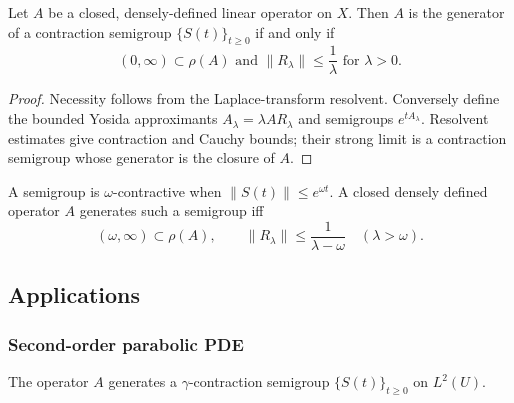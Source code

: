 \begin{theorem}
\label{thm:hille-yosida-theorem}
Let $A$ be a closed, densely-defined linear operator on $X$. Then $A$ is the generator of a contraction semigroup $\{S(t)\}_{t \geq 0}$ if and only if
\[
(0,\infty) \subset \rho(A) \text{ and } \|R_\lambda\| \leq \frac{1}{\lambda} \text{ for } \lambda > 0.
\tag{17}
\]
\end{theorem}

\begin{proof}
\sketch Necessity follows from the Laplace-transform resolvent. Conversely define the bounded Yosida approximants $A_\lambda=\lambda AR_\lambda$ and semigroups $e^{tA_\lambda}$. Resolvent estimates give contraction and Cauchy bounds; their strong limit is a contraction semigroup whose generator is the closure of $A$.
\end{proof}

\begin{remark}
\label{rem:omega-contractive-semigroup}
A semigroup is $\omega$-contractive when $\|S(t)\|\le e^{\omega t}$. A closed densely defined operator $A$ generates such a semigroup iff
\[
(\omega,\infty)\subset\rho(A),\qquad
\|R_\lambda\|\le\frac1{\lambda-\omega}\quad(\lambda>\omega).
\tag{23}
\]
\end{remark}

\subsection{Applications}

\subsubsection{Second-order parabolic PDE}

\begin{theorem}
\label{thm:parabolic-pde-as-semigroup}
The operator $A$ generates a $\gamma$-contraction semigroup $\{S(t)\}_{t \ge 0}$ on $L^2(U)$.
\end{theorem}


